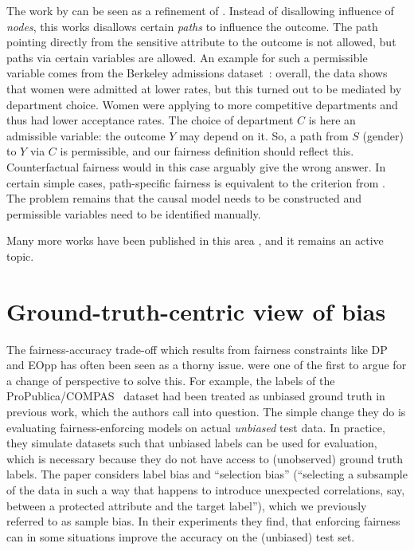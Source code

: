 The work by \citet{chiappa2019path} can be seen as a refinement of \citet{kilbertus2017avoiding}.
Instead of disallowing influence of \emph{nodes}, this works disallows certain \emph{paths} to influence the outcome.
The path pointing directly from the sensitive attribute to the outcome is not allowed,
but paths via certain variables are allowed.
An example for such a permissible variable comes from the Berkeley admissions dataset~\citep{bickel1975sex}:
overall, the data shows that women were admitted at lower rates,
but this turned out to be mediated by department choice.
Women were applying to more competitive departments and thus had lower acceptance rates.
The choice of department \(C\) is here an admissible variable:
the outcome \(Y\) may depend on it.
So, a path from \(S\) (gender) to \(Y\) via \(C\) is permissible, and our fairness definition should reflect this.
Counterfactual fairness \citep{kusner2017counterfactual} would in this case arguably give the wrong answer.
In certain simple cases, path-specific fairness is equivalent to the criterion from \citet{kilbertus2017avoiding}.
The problem remains that the causal model needs to be constructed
and permissible variables need to be identified manually.

Many more works have been published in this area \citep[\eg,][]{wu2019pc,kilbertus2020sensitivity,creager2020causal},
and it remains an active topic.
%


\section{Ground-truth-centric view of bias}%
\label{sec:groundtruth-centric-view-of-bias}
The fairness-accuracy trade-off which results from fairness constraints like \ac{DP} and \ac{EOpp}
has often been seen as a thorny issue.
\citet{wick2019unlocking} were one of the first to argue for a change of perspective to solve this.
For example, the labels of the ProPublica/COMPAS~\citep{angwin2016machine} dataset had been treated as unbiased ground truth in previous work,
which the authors call into question.
The simple change they do is evaluating fairness-enforcing models on actual \emph{unbiased} test data.
In practice, they simulate datasets such that unbiased labels can be used for evaluation,
which is necessary because they do not have access to (unobserved) ground truth labels.
The paper considers label bias and ``selection bias''
(``selecting a subsample of the data in such a way that happens to introduce unexpected correlations,
say, between a protected attribute and the target label''),
which we previously referred to as sample bias.
In their experiments they find,
that enforcing fairness can in some situations improve the accuracy on the (unbiased) test set.

